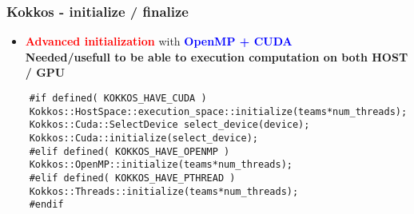 \begin{frame}[fragile=singleslide]
  \frametitle{Kokkos - initialize / finalize}

  \begin{itemize}
  \item \textcolor{red}{\textbf{Advanced initialization}} with \textcolor{blue}{\textbf{OpenMP + CUDA}}\\
    \textbf{Needed/usefull to be able to execution computation on both HOST / GPU}
  \end{itemize}
  \begin{verbatim}
    #if defined( KOKKOS_HAVE_CUDA )
    Kokkos::HostSpace::execution_space::initialize(teams*num_threads);
    Kokkos::Cuda::SelectDevice select_device(device);
    Kokkos::Cuda::initialize(select_device);
    #elif defined( KOKKOS_HAVE_OPENMP )
    Kokkos::OpenMP::initialize(teams*num_threads);
    #elif defined( KOKKOS_HAVE_PTHREAD )
    Kokkos::Threads::initialize(teams*num_threads);
    #endif
  \end{verbatim}
\end{frame}


